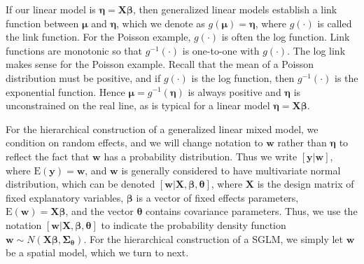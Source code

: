 \documentclass[12pt, titlepage]{article}
\begin{document}
If our linear model is $\boldsymbol{\eta} = \mathbf{X}\boldsymbol{\beta}$, then generalized linear models establish a link function between $\boldsymbol{\mu}$ and $\boldsymbol{\eta}$, which we denote as $g(\boldsymbol{\mu}) = \boldsymbol{\eta}$, where $g(\cdot)$ is called the link function.  For the Poisson example, $g(\cdot)$ is often the log function.  Link functions are monotonic so that $g^{-1}(\cdot)$ is one-to-one with $g(\cdot)$.  The log link makes sense for the Poisson example. Recall that the mean of a Poisson distribution must be positive, and if $g(\cdot)$ is the log function, then $g^{-1}(\cdot)$ is the exponential function. Hence $\boldsymbol{\mu} = g^{-1}(\boldsymbol{\eta})$ is always positive and $\boldsymbol{\eta}$ is unconstrained on the real line, as is typical for a linear model $\boldsymbol{\eta} = \mathbf{X}\boldsymbol{\beta}$.

For the hierarchical construction of a generalized linear mixed model, we condition on random effects, and we will change notation to $\mathbf{w}$ rather than $\boldsymbol{\eta}$ to reflect the fact that $\mathbf{w}$ has a probability distribution. Thus we write $[\mathbf{y}|\mathbf{w}]$, where $\textrm{E}(\mathbf{y}) = \mathbf{w}$, and $\mathbf{w}$ is generally considered to have multivariate normal distribution, which can be denoted $[\mathbf{w}|\mathbf{X}, \boldsymbol{\beta}, \boldsymbol{\theta}]$, where $\mathbf{X}$ is the design matrix of fixed explanatory variables, $\boldsymbol{\beta}$ is a vector of fixed effects parameters, $\textrm{E}(\mathbf{w}) = \mathbf{X}\boldsymbol{\beta}$, and the vector $\boldsymbol{\theta}$ contains covariance parameters.   Thus, we use the notation $[\mathbf{w}|\mathbf{X},\boldsymbol{\beta},\boldsymbol{\theta}]$ to indicate the probability density function $\mathbf{w} \sim N(\mathbf{X}\boldsymbol{\beta},\boldsymbol{\Sigma}_{\boldsymbol{\theta}})$. For the hierarchical construction of a SGLM, we simply let $\mathbf{w}$ be a spatial model, which we turn to next.

   
\end{document}
